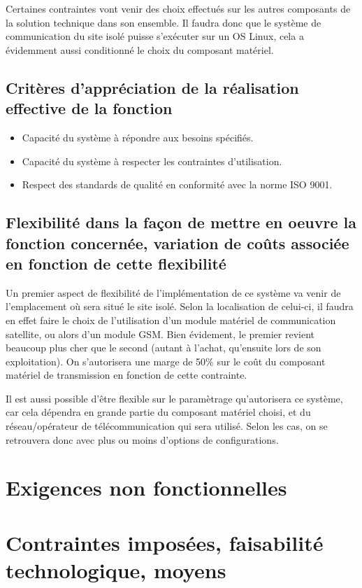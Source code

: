 Certaines contraintes vont venir des choix effectués sur les autres composants de la solution technique dans son ensemble. Il faudra donc que le système de communication du site isolé puisse s'exécuter sur un OS Linux, cela a évidemment aussi conditionné le choix du composant matériel.

\subsection{Critères d'appréciation de la réalisation effective de la fonction}

\begin{itemize}
\item Capacité du système à répondre aux besoins spécifiés.
\item Capacité du système à respecter les contraintes d'utilisation.
\item Respect des standards de qualité en conformité avec la norme ISO 9001.
\end{itemize}

\subsection{Flexibilité dans la façon de mettre en oeuvre la fonction concernée, variation de coûts associée en fonction de cette flexibilité}

Un premier aspect de flexibilité de l'implémentation de ce système va venir de l'emplacement où sera situé le site isolé. Selon la localisation de celui-ci, il faudra en effet faire le choix de l'utilisation d'un module matériel de communication satellite, ou alors d'un module GSM. Bien évidement, le premier revient beaucoup plus cher que le second (autant à l'achat, qu'ensuite lors de son exploitation). On s'autorisera une marge de 50\% sur le coût du composant matériel de transmission en fonction de cette contrainte.

Il est aussi possible d'être flexible sur le paramètrage qu'autorisera ce système, car cela dépendra en grande partie du composant matériel choisi, et du réseau/opérateur de télécommunication qui sera utilisé. Selon les cas, on se retrouvera donc avec plus ou moins d'options de configurations.

\section{Exigences non fonctionnelles}

\section{Contraintes imposées, faisabilité technologique, moyens}

